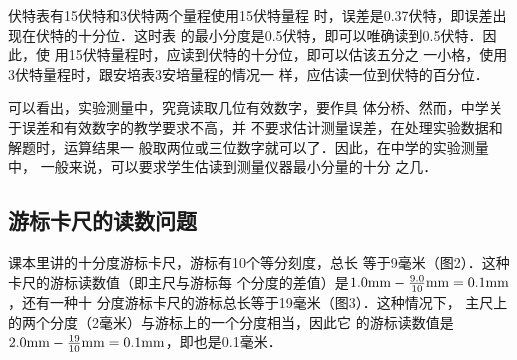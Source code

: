 伏特表有15伏特和3伏特两个量程使用15伏特量程
时，误差是0.37伏特，即误差出现在伏特的十分位．这时表
的最小分度是0.5伏特，即可以唯确读到0.5伏特．因此，使
用15伏特量程时，应读到伏特的十分位，即可以估该五分之
一小格，使用3伏特量程时，跟安培表3安培量程的情况一
样，应估读一位到伏特的百分位．

可以看出，实验测量中，究竟读取几位有效数字，要作具
体分桥、然而，中学关于误差和有效数字的教学要求不高，并
不要求估计测量误差，在处理实验数据和解题时，运算结果一
般取两位或三位数字就可以了．因此，在中学的实验测量中，
一般来说，可以要求学生估读到测量仪器最小分量的十分
之几．

\subsection{游标卡尺的读数问题}
课本里讲的十分度游标卡尺，游标有10个等分刻度，总长
等于9毫米（图2）．这种卡尺的游标读数值（即主尺与游标每
个分度的差值）是$1.0{\rm mm}-\frac{9.0}{10}{\rm mm}=0.1{\rm mm}$，还有一种十
分度游标卡尺的游标总长等于19毫米（图3）．这种情况下，
主尺上的两个分度（2毫米）与游标上的一个分度相当，因此它
的游标读数值是$2.0{\rm mm}-\frac{19}{10}{\rm mm}=0.1{\rm mm}$，即也是0.1毫米．

\begin{figure}[htp]\centering
    \begin{minipage}[t]{0.48\textwidth}
    \centering
{}
    \caption{}
    \end{minipage}
    \begin{minipage}[t]{0.48\textwidth}
    \centering
    \caption{}
    \end{minipage}
    \end{figure}




